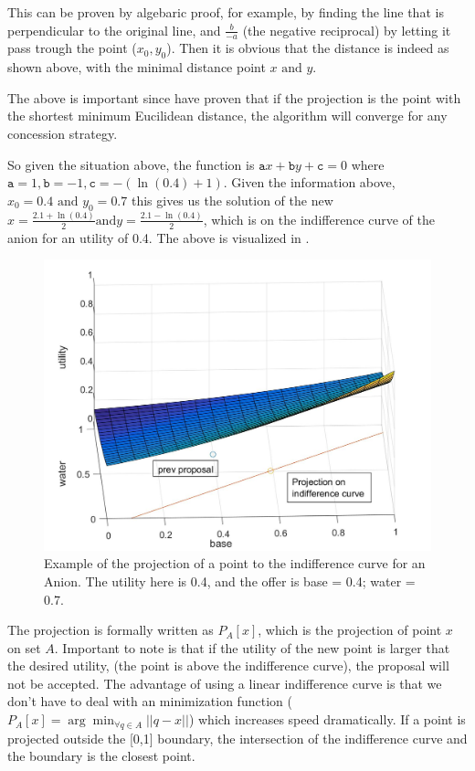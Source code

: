This can be proven by algebaric proof, for example, by finding the line that is perpendicular to the original line, and $\frac{b}{-a}$ (the negative reciprocal) by letting it pass trough the point ($x_0, y_0$). Then it is obvious that the distance is indeed as shown above, with the minimal distance point $x \text{ and }y$.

The above is important since \citet{zheng2015automated} have proven that if the projection is the point with the shortest minimum Eucilidean distance, the algorithm will converge for any concession strategy.

So given the situation above, the function is $\texttt{a} x + \texttt{b} y + \texttt{c} = 0$ where $\texttt{a} = 1, \texttt{b} = -1, \texttt{c} = -(\ln(0.4)+1)$. Given the information above, $x_0 = 0.4 \text{ and } y_0 = 0.7$ this gives us the solution of the new $x=\frac{2.1 + \ln(0.4)}{2} \text{and} y = \frac{2.1 - \ln(0.4)}{2}$, which is on the indifference curve of the anion for an utility of 0.4.
The above is visualized in .

\begin{figure}[h]
	\centering
	\includegraphics[width=0.7\linewidth]{img/projection_anion_example}
	\caption{Example of the projection of a point to the indifference curve for an Anion. The utility here is 0.4, and the offer is base = 0.4; water = 0.7.}
	\label{fig:projectionanionexample}
\end{figure}

The projection is formally written as $P_A[x]$, which is the projection of point $x$ on set $A$. Important to note is that if the utility of the new point is larger that the desired utility, (the point is above the indifference curve), the proposal will not be accepted. The advantage of using a linear indifference curve is that we don't have to deal with an minimization function ($P_A[x] = \arg \displaystyle \min_{\forall q \in A} ||q-x||$) which increases speed dramatically. If a point is projected outside the [0,1] boundary, the intersection of the indifference curve and the boundary is the closest point.


